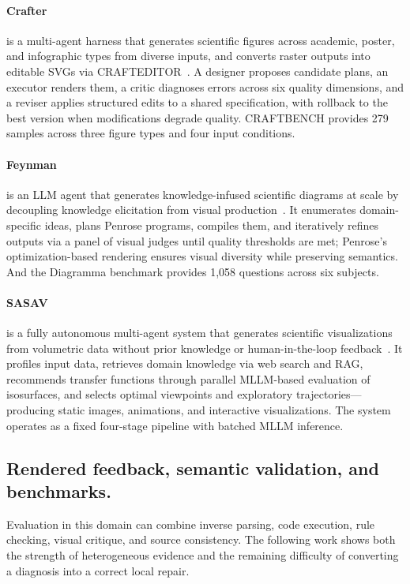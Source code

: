 \paragraph{Crafter}
 is a multi-agent harness that generates scientific figures across academic, poster, and infographic types from diverse inputs, and converts raster outputs into editable SVGs via CRAFTEDITOR~\cite{avg260530611}. A designer proposes candidate plans, an executor renders them, a critic diagnoses errors across six quality dimensions, and a reviser applies structured edits to a shared specification, with rollback to the best version when modifications degrade quality. CRAFTBENCH provides 279 samples across three figure types and four input conditions.

\paragraph{Feynman}
 is an LLM agent that generates knowledge-infused scientific diagrams at scale by decoupling knowledge elicitation from visual production~\cite{avg260312597}. It enumerates domain-specific ideas, plans Penrose programs, compiles them, and iteratively refines outputs via a panel of visual judges until quality thresholds are met; Penrose's optimization-based rendering ensures visual diversity while preserving semantics. And the Diagramma benchmark provides 1,058 questions across six subjects.

\paragraph{SASAV}
 is a fully autonomous multi-agent system that generates scientific visualizations from volumetric data without prior knowledge or human-in-the-loop feedback~\cite{avg260403406}. It profiles input data, retrieves domain knowledge via web search and RAG, recommends transfer functions through parallel MLLM-based evaluation of isosurfaces, and selects optimal viewpoints and exploratory trajectories—producing static images, animations, and interactive visualizations. The system operates as a fixed four-stage pipeline with batched MLLM inference.  

\subsection{Rendered feedback, semantic validation, and benchmarks.}
Evaluation in this domain can combine inverse parsing, code execution, rule checking, visual critique, and source consistency. The following work shows both the strength of heterogeneous evidence and the remaining difficulty of converting a diagnosis into a correct local repair.


